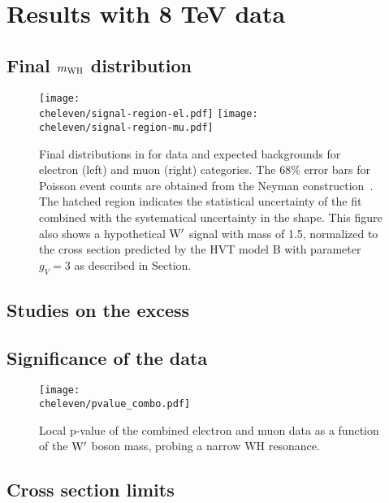 \chapter{Results with 8 TeV data}
\label{ch:results8}

\section{Final $m_{\rm WH}$ distribution}

\begin{figure}[htbp]
\centering
\texttt{[image: \\cheleven/signal-region-el.pdf]}
\texttt{[image: \\cheleven/signal-region-mu.pdf]}
\caption{
Final distributions in \mWH for data and expected backgrounds for electron (left) and muon (right) categories.
The 68\% error bars for Poisson event counts are obtained from the Neyman construction~\cite{Garwood}. The hatched region indicates the statistical uncertainty of the fit combined with the systematical uncertainty in the shape. This figure also shows a hypothetical $\mathrm{W}^\prime$ signal with mass of 1.5\TeV, normalized to the cross section predicted by the HVT model B with parameter $g_V=3$ as described in Section.
}
\label{fig:MZZwithBackgroundWH}
\end{figure}

\section{Studies on the excess}

\section{Significance of the data}

\begin{figure}[htb]
\centering
     \texttt{[image: \\cheleven/pvalue\_combo.pdf]}
\caption{
  Local p-value of the combined electron and muon data as a function of the $\mathrm{W}^\prime$ boson mass,
  probing a narrow WH resonance.
}
\label{fig:sig}
\end{figure}

\section{Cross section limits}

